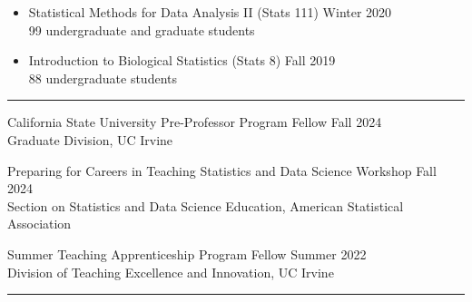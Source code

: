 \documentclass{article}
\begin{document}
\begin{description}
\begin{itemize}
			\item Statistical Methods for Data Analysis II (Stats 111) \hfill{Winter 2020}\\
			99 undergraduate and graduate students %
			
			\item Introduction to Biological Statistics (Stats 8) \hfill{Fall 2019}\\
			88 undergraduate students %
		\end{itemize}
		
	\end{description}
	\vspace{-2mm}
	\rule{\linewidth}{1pt}
	
	
	
	\begin{description}
		\vspace{-2mm}
		\item[Teaching Preparation]\hspace*{.1in}
		
		California State University Pre-Professor Program Fellow \hfill{Fall 2024}\\
		Graduate Division, UC Irvine 
		\vspace*{1mm}
		
		
		Preparing for Careers in Teaching Statistics and Data Science Workshop \hfill{Fall 2024}\\
		Section on Statistics and Data Science Education, American Statistical Association 
		\vspace*{1mm}
		
		Summer Teaching Apprenticeship Program Fellow \hfill{Summer 2022}\\
		Division of Teaching Excellence and Innovation, UC Irvine
		\vspace*{1mm}
		
	\end{description}
	\vspace{-2mm}
	\rule{\linewidth}{1pt}
	
	
\end{document}
